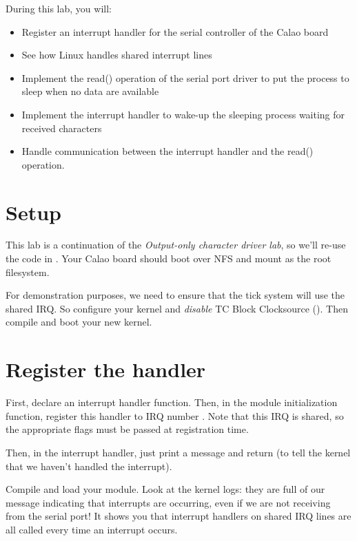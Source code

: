 
During this lab, you will:

\begin{itemize}
\item Register an interrupt handler for the serial controller of the
  Calao board
\item See how Linux handles shared interrupt lines
\item Implement the read() operation of the serial port driver to put
  the process to sleep when no data are available
\item Implement the interrupt handler to wake-up the sleeping process
  waiting for received characters
\item Handle communication between the interrupt handler and the
  read() operation.
\end{itemize}

\section{Setup}

This lab is a continuation of the {\em Output-only character driver
  lab}, so we'll re-use the code in
. Your Calao board should boot over
NFS and mount  as the root
filesystem.

For demonstration purposes, we need to ensure that the tick system will
use the shared IRQ. So configure your kernel and {\em disable} TC
Block Clocksource (). Then compile
and boot your new kernel.

\section{Register the handler}

First, declare an interrupt handler function. Then, in the module
initialization function, register this handler to IRQ number
. Note that this IRQ is shared,
so the appropriate flags must be passed at registration time.

Then, in the interrupt handler, just print a message and
return  (to tell the kernel that we haven't handled
the interrupt).

Compile and load your module. Look at the kernel logs: they are full
of our message indicating that interrupts are occurring, even if we
are not receiving from the serial port! It shows you that interrupt
handlers on shared IRQ lines are all called every time an interrupt
occurs.

